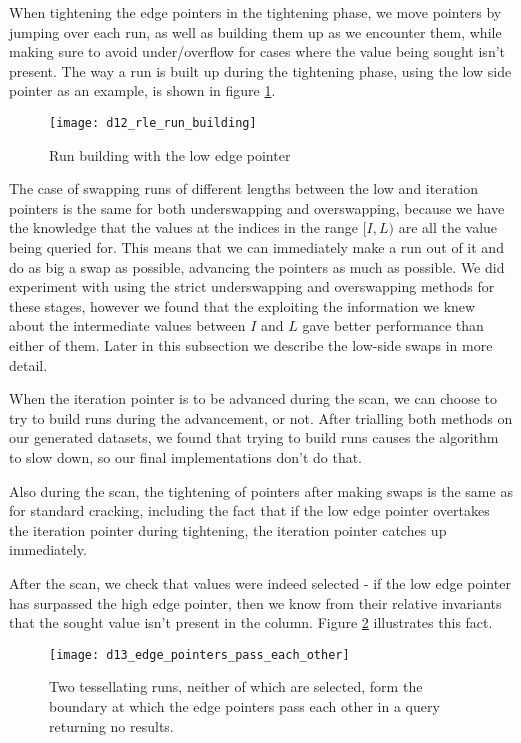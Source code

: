When tightening the edge pointers in the tightening phase, we move pointers by jumping over each run, as well as building them up as we encounter them, while making sure to avoid under/overflow for cases where the value being sought isn't present. The way a run is built up during the tightening phase, using the low side pointer as an example, is shown in figure \ref{fig:rle_run_building}.

\begin{figure}[H]
  \centering
  \texttt{[image: d12\_rle\_run\_building]}
  \caption{Run building with the low edge pointer}
  \label{fig:rle_run_building}
\end{figure}

The case of swapping runs of different lengths between the low and iteration pointers is the same for both underswapping and overswapping, because we have the knowledge that the values at the indices in the range $[I, L)$ are all the value being queried for. This means that we can immediately make a run out of it and do as big a swap as possible, advancing the pointers as much as possible. We did experiment with using the strict underswapping and overswapping methods for these stages, however we found that the exploiting the information we knew about the intermediate values between $I$ and $L$ gave better performance than either of them. Later in this subsection we describe the low-side swaps in more detail.

When the iteration pointer is to be advanced during the scan, we can choose to try to build runs during the advancement, or not. After trialling both methods on our generated datasets, we found that trying to build runs causes the algorithm to slow down, so our final implementations don't do that.

Also during the scan, the tightening of pointers after making swaps is the same as for standard cracking, including the fact that if the low edge pointer overtakes the iteration pointer during tightening, the iteration pointer catches up immediately.

After the scan, we check that values were indeed selected - if the low edge pointer has surpassed the high edge pointer, then we know from their relative invariants that the sought value isn't present in the column. Figure \ref{fig:edge_pointers_pass_each_other} illustrates this fact.

\begin{figure}[H]
  \centering
  \texttt{[image: d13\_edge\_pointers\_pass\_each\_other]}
  \caption{Two tessellating runs, neither of which are selected, form the boundary at which the edge pointers pass each other in a query returning no results.}
  \label{fig:edge_pointers_pass_each_other}
\end{figure}

